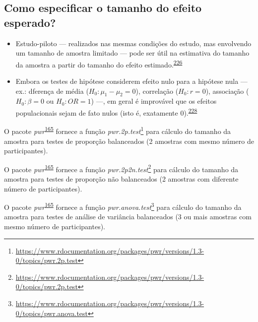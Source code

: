 \documentclass[
  a4paper,
]{book}
\renewcommand{\href}[2]{#2\footnote{\url{#1}}}
\newenvironment{infobox}[1]
  {
  \begin{itemize}
  \renewcommand{\labelitemi}{
    \raisebox{-.7\height}[0pt][0pt]{
      {\setkeys{Gin}{width=3em,keepaspectratio}
        \texttt{[image: \#1]}}
    }
  }
  \setlength{\fboxsep}{1em}
  \begin{blackbox}
  \item
  }
  {
  \end{blackbox}
  \end{itemize}
  }
\begin{document}
\hypertarget{como-especificar-o-tamanho-do-efeito-esperado}{%
\subsection{Como especificar o tamanho do efeito esperado?}\label{como-especificar-o-tamanho-do-efeito-esperado}}

\begin{itemize}
\item
  Estudo-piloto --- realizados nas mesmas condições do estudo, mas envolvendo um tamanho de amostra limitado --- pode ser útil na estimativa do tamanho da amostra a partir do tamanho do efeito estimado.\textsuperscript{\protect\hyperlink{ref-rodruxedguezdeluxe1guila2014}{226}}
\item
  Embora os testes de hipótese considerem efeito nulo para a hipótese nula --- ex.: dferença de média (\(H_{0}: \mu_{1} - \mu_{2}=0\)), correlação (\(H_{0}: r=0\)), associação (\(H_{0}: \beta=0\) ou \(H_{0}: OR=1\)) ---, em geral é improvável que os efeitos populacionais sejam de fato nulos (isto é, exatamente 0).\textsuperscript{\protect\hyperlink{ref-Andrade2020}{228}}
\end{itemize}

\begin{infobox}{images/Rlogo}
O pacote \emph{pwr}\textsuperscript{\protect\hyperlink{ref-pwr}{165}} fornece a função \href{https://www.rdocumentation.org/packages/pwr/versions/1.3-0/topics/pwr.2p.test}{\emph{pwr.2p.test}} para cálculo do tamanho da amostra para testes de proporção balanceados (2 amostras com mesmo número de participantes).

\end{infobox}

\begin{infobox}{images/Rlogo}
O pacote \emph{pwr}\textsuperscript{\protect\hyperlink{ref-pwr}{165}} fornece a função \href{https://www.rdocumentation.org/packages/pwr/versions/1.3-0/topics/pwr.2p.test}{\emph{pwr.2p2n.test}} para cálculo do tamanho da amostra para testes de proporção não balanceados (2 amostras com diferente número de participantes).

\end{infobox}

\begin{infobox}{images/Rlogo}
O pacote \emph{pwr}\textsuperscript{\protect\hyperlink{ref-pwr}{165}} fornece a função \href{https://www.rdocumentation.org/packages/pwr/versions/1.3-0/topics/pwr.anova.test}{\emph{pwr.anova.test}} para cálculo do tamanho da amostra para testes de análise de variância balanceados (3 ou mais amostras com mesmo número de participantes).

\end{infobox}
\end{document}
